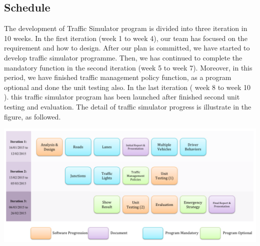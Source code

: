 \documentclass[11pt]{article}
\begin{document}
	\subsection{Schedule}
		\indent\indent The development of Traffic Simulator program is divided into three iteration in 10 weeks. In the first iteration (week 1 to week 4), our team has focused on the requirement and how to design. After our plan is committed, we have started to develop traffic simulator programme. Then, we has continued to complete the mandatory function in the second iteration (week 5 to week 7). Moreover, in this period, we have finished traffic management policy function, as a program optional and done the unit testing also. In the last iteration ( week 8 to week 10 ). this traffic simulator program has been launched after finished second unit testing and evaluation. The detail of traffic simulator progress is illustrate in the figure, as followed.      
\begin{center}			
			\includegraphics[scale = 0.35]{Figure01}
\end{center}
\end{document}
